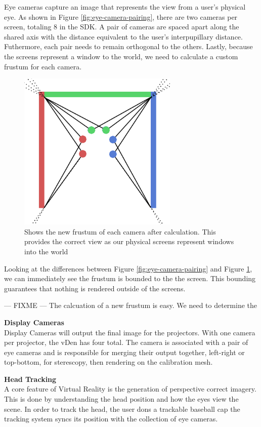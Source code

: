 Eye cameras capture an image that represents the view from a user's physical eye. As shown in Figure \ref{fig:eye-camera-pairing}, there are two cameras per screen, totaling 8 in the SDK. A pair of cameras are spaced apart along the shared axis with the distance equivalent to the user's interpupillary distance. Futhermore, each pair needs to remain orthogonal to the others. Lastly, because the screens represent a window to the world, we need to calculate a custom frustum for each camera.

\begin{figure}[H]
	\centering
	\includegraphics[width=3in]{images/camera-pairs-calibrated}
	\caption[The New Frustum of Eye Cameras]{Shows the new frustum of each camera after calculation. This provides the correct view as our physical screens represent windows into the world}
	\label{fig:eye-camera-frustum}
\end{figure}

Looking at the differences between Figure \ref{fig:eye-camera-pairing} and Figure \ref{fig:eye-camera-frustum}, we can immediately see the frustum is bounded to the the screen. This bounding guarantees that nothing is rendered outside of the screens. 

--- FIXME ---
The calcuation of a new frustum is easy. We need to determine the

\filbreak
\noindent\textbf{Display Cameras} \\
Display Cameras will output the final image for the projectors. With one camera per projector, the vDen has four total. The camera is associated with a pair of eye cameras and is responsible for merging their output together, left-right or top-bottom, for sterescopy, then rendering on the calibration mesh.

\filbreak
\noindent\textbf{Head Tracking} \\
A core feature of Virtual Reality is the generation of perspective correct imagery. This is done by understanding the head position and how the eyes view the scene. In order to track the head, the user dons a trackable baseball cap the tracking system syncs its position with the collection of eye cameras.

